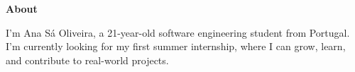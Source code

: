 \noindent\textbf{About}
\noindent\hrulefill
\vspace{0.25em}
\begin{adjustwidth}{1.5em}{0em}
I'm Ana Sá Oliveira, a 21-year-old
software engineering student from Portugal.
I'm currently looking for my first summer
internship, where I can grow, learn, and
contribute to real-world projects.
\end{adjustwidth}
\vspace{0.25em}
